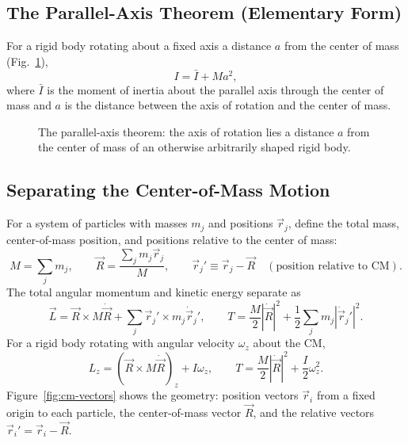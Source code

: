 \documentclass[11pt]{article}
\begin{document}
\subsection{The Parallel-Axis Theorem (Elementary Form)}

For a rigid body rotating about a fixed axis a distance $a$ from the center of mass (Fig.~\ref{fig:parallel-elem}),
\begin{equation}
I = \bar I + Ma^2,
\label{eq:parallel-elem}
\end{equation}
where $\bar I$ is the moment of inertia about the parallel axis through the center of mass and $a$ is the distance between the axis of rotation and the center of mass.

\begin{figure}[htb]
\centering
{}
\caption{The parallel-axis theorem: the axis of rotation lies a distance $a$ from the center of mass of an otherwise arbitrarily shaped rigid body.}
\label{fig:parallel-elem}
\end{figure}

\subsection{Separating the Center-of-Mass Motion}

For a system of particles with masses $m_j$ and positions $\vec r_j$, define the total mass, center-of-mass position, and positions relative to the center of mass:
\begin{equation}
M = \sum_j m_j, \qquad \vec R = \frac{\sum_j m_j\vec r_j}{M}, \qquad \vec r_j' \equiv \vec r_j - \vec R \quad (\text{position relative to CM}).
\label{eq:cm-defs}
\end{equation}
The total angular momentum and kinetic energy separate as
\begin{equation}
\vec L = \vec R\times M\dot{\vec R} + \sum_j \vec r_j'\times m_j\dot{\vec r}_j', \qquad
T = \frac{M}{2}\left|\dot{\vec R}\right|^2 + \frac12\sum_j m_j\left|\dot{\vec r}_j'\right|^2.
\label{eq:L-T-split}
\end{equation}
For a rigid body rotating with angular velocity $\omega_z$ about the CM,
\begin{equation}
L_z = \left(\vec R\times M\dot{\vec R}\right)_z + I\omega_z, \qquad T = \frac{M}{2}\left|\dot{\vec R}\right|^2 + \frac{I}{2}\omega_z^2.
\label{eq:L-T-rigid}
\end{equation}
Figure~\ref{fig:cm-vectors} shows the geometry: position vectors $\vec r_i$ from a fixed origin to each particle, the center-of-mass vector $\vec R$, and the relative vectors $\vec r_i'=\vec r_i-\vec R$.
\end{document}
